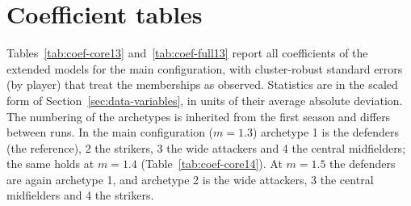 \chapter{Coefficient tables}
\label{app:coef}

Tables~\ref{tab:coef-core13} and~\ref{tab:coef-full13} report all coefficients of the extended models for the main configuration, with cluster-robust standard errors (by player) that treat the memberships as observed. Statistics are in the scaled form of Section~\ref{sec:data-variables}, in units of their average absolute deviation. The numbering of the archetypes is inherited from the first season and differs between runs. In the main configuration ($m=1.3$) archetype 1 is the defenders (the reference), 2 the strikers, 3 the wide attackers and 4 the central midfielders; the same holds at $m=1.4$ (Table~\ref{tab:coef-core14}). At $m=1.5$ the defenders are again archetype 1, and archetype 2 is the wide attackers, 3 the central midfielders and 4 the strikers.

\begin{table}[ht]
	\centering
	\footnotesize
	\caption{Core baseline with membership changes, $m=1.3$ (main configuration)}
	\label{tab:coef-core13}
	
\end{table}

\begin{table}[ht]
	\centering
	\scriptsize
	\caption{Full baseline with membership changes, $m=1.3$ (main configuration)}
	\label{tab:coef-full13}
	
\end{table}

\begin{table}[ht]
	\centering
	\footnotesize
	\caption{Core baseline with membership changes, $m=1.4$}
	\label{tab:coef-core14}
	
\end{table}
